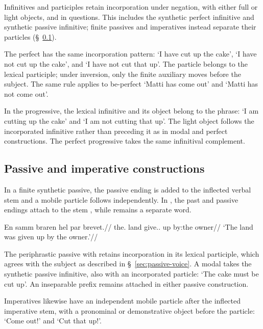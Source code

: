 Infinitives and participles retain incorporation under negation, with either full or light objects, and in questions. This includes the synthetic perfect infinitive and synthetic passive infinitive; finite passives and imperatives instead separate their particles (\S~\ref{sec:particle-passive}).

The perfect has the same incorporation pattern:  `I have cut up the cake',  `I have not cut up the cake', and  `I have not cut that up'. The particle belongs to the lexical participle; under inversion, only the finite auxiliary moves before the subject. The same rule applies to be-perfect  `Matti has come out' and  `Matti has not come out'.

In the progressive, the lexical infinitive and its object belong to the  phrase:  `I am cutting up the cake' and  `I am not cutting that up'. The light object follows the incorporated infinitive rather than preceding it as in modal and perfect constructions. The perfect progressive  takes the same infinitival complement.

\subsection{Passive and imperative constructions}
\label{sec:particle-passive}

In a finite synthetic passive, the passive ending is added to the inflected verbal stem and a mobile particle follows independently. In , the past and passive endings attach to the stem , while  remains a separate word.

\pex
\begingl
\gla En samm braren hel par brevet.//
\glb the.\M{} land give.\Pst{}.\Pass{} up by:the owner//
\glft `The land was given up by the owner.'//
\endgl
\xe

The periphrastic passive with  retains incorporation in its lexical participle, which agrees with the subject as described in \S~\ref{sec:passive-voice}. A modal takes the synthetic passive infinitive, also with an incorporated particle:  `The cake must be cut up'. An inseparable prefix remains attached in either passive construction.

Imperatives likewise have an independent mobile particle after the inflected imperative stem, with a pronominal or demonstrative object before the particle:  `Come out!' and  `Cut that up!'.

